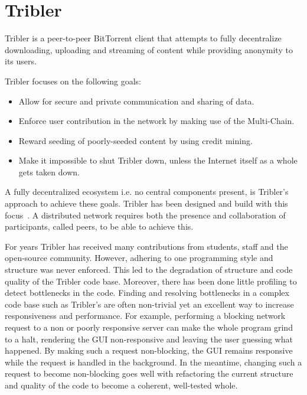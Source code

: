 \section{Tribler}
Tribler is a peer-to-peer BitTorrent client that attempts to fully decentralize downloading, uploading and streaming of content while providing anonymity to its users.

Tribler focuses on the following goals:
\begin{itemize}
    \item Allow for secure and private communication and sharing of data.
    \item Enforce user contribution in the network by making use of the Multi-Chain.
    \item Reward seeding of poorly-seeded content by using credit mining.
    \item Make it impossible to shut Tribler down, unless the Internet itself as a whole gets taken down.
\end{itemize}

A fully decentralized ecosystem i.e. no central components present, is Tribler's approach to achieve these goals.
Tribler has been designed and build with this focus~\cite{Pouwelse-tribler,Bakker-tribler}.
A distributed network requires both the presence and collaboration of participants, called peers, to be able to achieve this.


For years Tribler has received many contributions from students, staff and the open-source community.
However, adhering to one programming style and structure was never enforced.
This led to the degradation of structure and code quality of the Tribler code base.
Moreover, there has been done little profiling to detect bottlenecks in the code.
Finding and resolving bottlenecks in a complex code base such as Tribler's are often non-trivial yet an excellent way to increase responsiveness and performance.
For example, performing a blocking network request to a non or poorly responsive server can make the whole program grind to a halt, rendering the GUI non-responsive and leaving the user guessing what happened.
By making such a request non-blocking, the GUI remains responsive while the request is handled in the background.
In the meantime, changing such a request to become non-blocking goes well with refactoring the current structure and quality of the code to become a coherent, well-tested whole.\\

